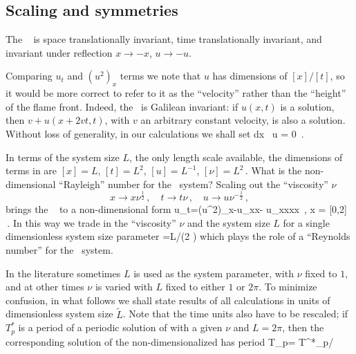 %

\subsection{Scaling and symmetries}


The \KSe\  is space translationally invariant,
time translationally invariant, and invariant under
reflection
$x \to -x$, 
$u \to -u$. 

Comparing $u_t$ and $(u^2)_x$ terms we note that $u$ has
dimensions of $[x]/[t]$, so it would be more correct to
refer to it as the ``velocity'' rather than the 
``height'' of the flame front. Indeed, the  \KSe\ is
Galilean invariant: if $u(x,t)$ is a solution, then 
$v+u(x+2vt,t)$, with $v$ an arbitrary constant velocity, is also a solution. 
Without loss of generality, in our calculations we shall set 
\beq
\int dx \, u = 0
\,.

In terms of the system size $L$, the only length scale available,
the dimensions of terms in  are
$ %
[x]=L
$, $%
[t]=L^2
$, $%
[u]=L^{-1}
$, $%
[\nu]=L^2
\,.
$ %
What is the non-dimensional ``Rayleigh'' number for the
\KS\ system? 
 Scaling out the ``viscosity'' $\nu$ 
\[ 
x \to x \nu^{\frac{1}{2}}
\,,\quad
t \to t \nu
\,,\quad
u \to u \nu^{-\frac{1}{2}}
\,,
\]
brings the \KSe\ 
to a non-dimensional form
\beq
u_t=(u^2)_x-u_{xx}- u_{xxxx}
\,,\qquad	
	x \in  [0,L\nu^{-\frac{1}{2}}] = [0,2\pi{}]
\,.
In this way we trade in the ``viscosity'' $\nu$
and the system size $L$ for a single
dimensionless system size parameter
\beq
	={L}/{(2 \pi \sqrt{\nu})}
which plays the role of a ``Reynolds number''
for the \KS\ system.

In the literature sometimes 
$L$ is used as the system parameter, with $\nu$ fixed to $1$, and
at other times $\nu$ is varied with $L$ fixed to either $1$ or $2\pi$.
To minimize confusion,
in what follows we shall state results of all 
calculations in units of dimensionless system size $\tilde{L}$.
Note that the time units also have to be
rescaled; if $T^*_p$ is a period
of a periodic solution of  with a given
$\nu$ and $L=2\pi$, then
the corresponding solution of the non-dimensionalized 
has period 
\beq
 T_p= T^*_p/\nu
{}

